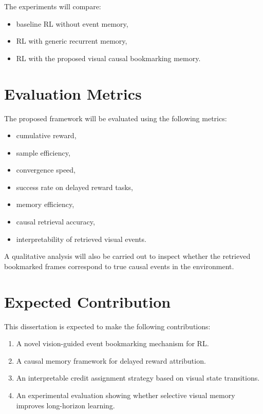 \documentclass[12pt,a4paper]{article}
\begin{document}
The experiments will compare:
\begin{itemize}
    \item baseline RL without event memory,
    \item RL with generic recurrent memory,
    \item RL with the proposed visual causal bookmarking memory.
\end{itemize}

\section{Evaluation Metrics}

The proposed framework will be evaluated using the following metrics:

\begin{itemize}
    \item cumulative reward,
    \item sample efficiency,
    \item convergence speed,
    \item success rate on delayed reward tasks,
    \item memory efficiency,
    \item causal retrieval accuracy,
    \item interpretability of retrieved visual events.
\end{itemize}

A qualitative analysis will also be carried out to inspect whether the retrieved bookmarked frames correspond to true causal events in the environment.

\section{Expected Contribution}

This dissertation is expected to make the following contributions:

\begin{enumerate}[label=\arabic*.]
    \item A novel vision-guided event bookmarking mechanism for RL.
    \item A causal memory framework for delayed reward attribution.
    \item An interpretable credit assignment strategy based on visual state transitions.
    \item An experimental evaluation showing whether selective visual memory improves long-horizon learning.
\end{enumerate}
\end{document}

